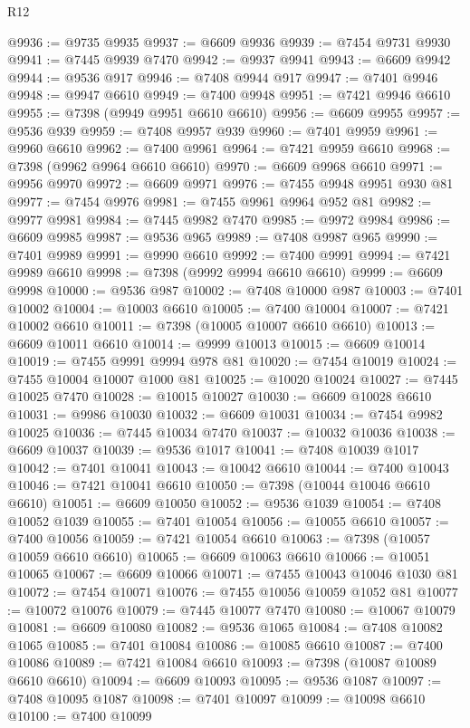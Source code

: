 \begin{lexlean}{R12}
\begin{coremodule}
{{{{{{{{{{{{{{{{{{{{{{{{{{{{{{{{{{{{{{{{{{{{{{{{{{{{{{{{{{{{{{{{{{{{{{{{{{{{{{{{{{@9936 := @9735 @9935
@9937 := @6609 @9936
@9939 := @7454 @9731 @9930
@9941 := @7445 @9939 @7470
@9942 := @9937 @9941
@9943 := @6609 @9942
@9944 := @9536 @917
@9946 := @7408 @9944 @917
@9947 := @7401 @9946
@9948 := @9947 @6610
@9949 := @7400 @9948
@9951 := @7421 @9946 @6610
@9955 := @7398 (@9949 @9951 @6610 @6610)
@9956 := @6609 @9955
@9957 := @9536 @939
@9959 := @7408 @9957 @939
@9960 := @7401 @9959
@9961 := @9960 @6610
@9962 := @7400 @9961
@9964 := @7421 @9959 @6610
@9968 := @7398 (@9962 @9964 @6610 @6610)
@9970 := @6609 @9968 @6610
@9971 := @9956 @9970
@9972 := @6609 @9971
@9976 := @7455 @9948 @9951 @930 @81
@9977 := @7454 @9976
@9981 := @7455 @9961 @9964 @952 @81
@9982 := @9977 @9981
@9984 := @7445 @9982 @7470
@9985 := @9972 @9984
@9986 := @6609 @9985
@9987 := @9536 @965
@9989 := @7408 @9987 @965
@9990 := @7401 @9989
@9991 := @9990 @6610
@9992 := @7400 @9991
@9994 := @7421 @9989 @6610
@9998 := @7398 (@9992 @9994 @6610 @6610)
@9999 := @6609 @9998
@10000 := @9536 @987
@10002 := @7408 @10000 @987
@10003 := @7401 @10002
@10004 := @10003 @6610
@10005 := @7400 @10004
@10007 := @7421 @10002 @6610
@10011 := @7398 (@10005 @10007 @6610 @6610)
@10013 := @6609 @10011 @6610
@10014 := @9999 @10013
@10015 := @6609 @10014
@10019 := @7455 @9991 @9994 @978 @81
@10020 := @7454 @10019
@10024 := @7455 @10004 @10007 @1000 @81
@10025 := @10020 @10024
@10027 := @7445 @10025 @7470
@10028 := @10015 @10027
@10030 := @6609 @10028 @6610
@10031 := @9986 @10030
@10032 := @6609 @10031
@10034 := @7454 @9982 @10025
@10036 := @7445 @10034 @7470
@10037 := @10032 @10036
@10038 := @6609 @10037
@10039 := @9536 @1017
@10041 := @7408 @10039 @1017
@10042 := @7401 @10041
@10043 := @10042 @6610
@10044 := @7400 @10043
@10046 := @7421 @10041 @6610
@10050 := @7398 (@10044 @10046 @6610 @6610)
@10051 := @6609 @10050
@10052 := @9536 @1039
@10054 := @7408 @10052 @1039
@10055 := @7401 @10054
@10056 := @10055 @6610
@10057 := @7400 @10056
@10059 := @7421 @10054 @6610
@10063 := @7398 (@10057 @10059 @6610 @6610)
@10065 := @6609 @10063 @6610
@10066 := @10051 @10065
@10067 := @6609 @10066
@10071 := @7455 @10043 @10046 @1030 @81
@10072 := @7454 @10071
@10076 := @7455 @10056 @10059 @1052 @81
@10077 := @10072 @10076
@10079 := @7445 @10077 @7470
@10080 := @10067 @10079
@10081 := @6609 @10080
@10082 := @9536 @1065
@10084 := @7408 @10082 @1065
@10085 := @7401 @10084
@10086 := @10085 @6610
@10087 := @7400 @10086
@10089 := @7421 @10084 @6610
@10093 := @7398 (@10087 @10089 @6610 @6610)
@10094 := @6609 @10093
@10095 := @9536 @1087
@10097 := @7408 @10095 @1087
@10098 := @7401 @10097
@10099 := @10098 @6610
@10100 := @7400 @10099
}}}}}}}}}}}}}}}}}}}}}}}}}}}}}}}}}}}}}}}}}}}}}}}}}}}}}}}}}}}}}}}}}}}}}}}}}}}}}}}}}}
\end{coremodule}
\end{lexlean}
